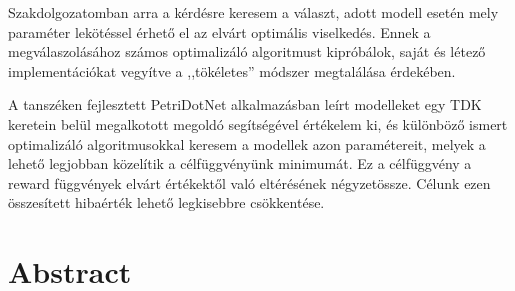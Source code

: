Szakdolgozatomban arra a kérdésre keresem a választ, adott modell esetén mely paraméter lekötéssel érhető el az elvárt optimális viselkedés. Ennek a megválaszolásához számos optimalizáló algoritmust kipróbálok, saját és létező implementációkat vegyítve a ,,tökéletes'' módszer megtalálása érdekében.

A tanszéken fejlesztett PetriDotNet alkalmazásban leírt modelleket egy TDK keretein belül megalkotott megoldó segítségével értékelem ki, és különböző ismert optimalizáló algoritmusokkal keresem a modellek azon paramétereit, melyek a lehető legjobban közelítik a célfüggvényünk minimumát. Ez a célfüggvény a reward függvények elvárt értékektől való eltérésének négyzetössze. Célunk ezen összesített hibaérték lehető legkisebbre csökkentése.


\vfill
\selectenglish


\chapter*{Abstract}



\vfill
\selectthesislanguage

\setcounter{romanPage}{\value{page}}
